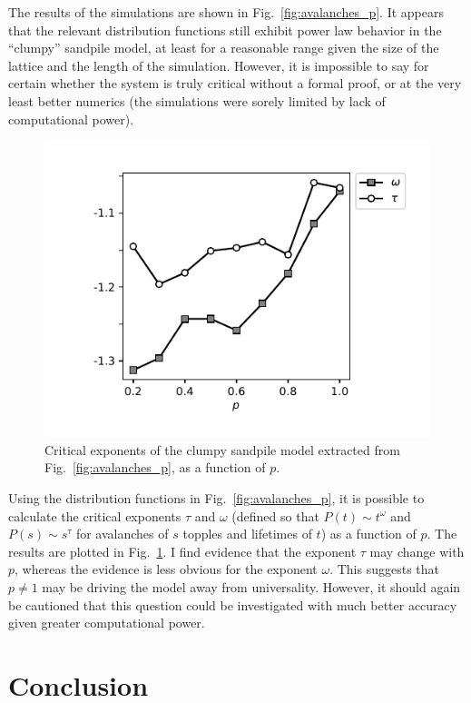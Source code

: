 \documentclass[aps,prb,reprint,superscriptaddress]{revtex4-2}
\begin{document}
The results of the simulations are shown in Fig.~\ref{fig:avalanches_p}. It appears that the relevant distribution functions still exhibit power law behavior in the ``clumpy'' sandpile model, at least for a reasonable range given the size of the lattice and the length of the simulation. However, it is impossible to say for certain whether the system is truly critical without a formal proof, or at the very least better numerics (the simulations were sorely limited by lack of computational power).

\begin{figure}
\includegraphics{exps}
\caption{\label{fig:exps} Critical exponents of the clumpy sandpile model extracted from Fig.~\ref{fig:avalanches_p}, as a function of $p$.}
\end{figure}

Using the distribution functions in Fig.~\ref{fig:avalanches_p}, it is possible to calculate the critical exponents $\tau$ and $\omega$ (defined so that $P(t) \sim t^\omega$ and $P(s) \sim s^\tau$ for avalanches of $s$ topples and lifetimes of $t$) as a function of $p$. The results are plotted in Fig.~\ref{fig:exps}. I find evidence that the exponent $\tau$ may change with $p$, whereas the evidence is less obvious for the exponent $\omega$. This suggests that $p\neq 1$ may be driving the model away from universality. However, it should again be cautioned that this question could be investigated with much better accuracy given greater computational power.

\section{Conclusion}
\end{document}
